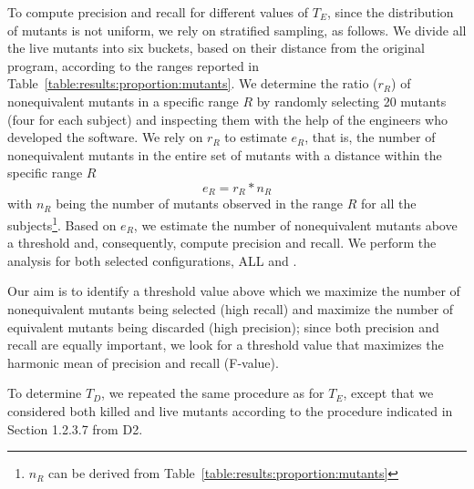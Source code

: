 To compute precision and recall for different values of $T_E$, since the distribution of mutants is not uniform, we rely on stratified sampling, as follows. 
We divide all the live mutants into six buckets, based on their distance from the original program, according to the ranges reported in Table~\ref{table:results:proportion:mutants}. 
We determine the ratio ($r_R$) of nonequivalent mutants in a specific range $R$ by randomly selecting 20 mutants (four for each subject) and inspecting them with the help of the engineers who developed the software. 
We rely on $r_R$ to estimate $e_{R}$, that is, the number of nonequivalent mutants in the entire set of mutants with a distance within the specific  range $R$
$$e_R = r_R * n_R$$
with $n_R$ being the number of mutants observed in the range $R$ for all the subjects\footnote{$n_R$ can be derived from Table~\ref{table:results:proportion:mutants}}.
Based on $e_R$, we estimate the number of nonequivalent mutants above a threshold and, consequently, compute precision and recall. We perform the analysis for both selected configurations,  ALL and \APPR.

Our aim is to identify a threshold value above which  we
maximize the number of nonequivalent mutants being selected (high recall) and maximize the number of equivalent mutants being discarded (high precision); since both precision and recall are equally important, we look for a threshold value that maximizes the harmonic mean of precision and recall (F-value).

To determine $T_D$, we repeated the same procedure as for $T_E$, except that we considered both killed and live mutants according to the procedure indicated in Section 1.2.3.7 from D2.

